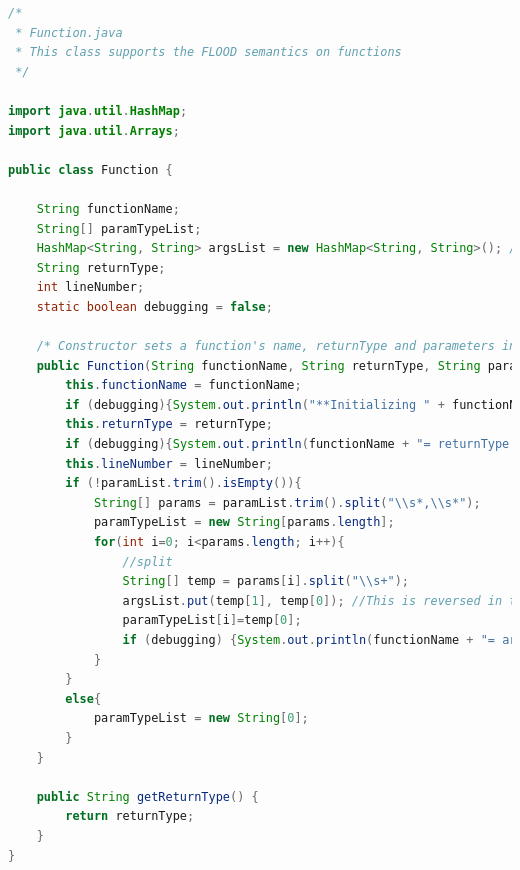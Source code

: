 \documentclass[12pt]{report}
\begin{document}
\begin{singlespace}
\begin{lstlisting}[language=Java,label=some-code,caption={Function.java}]
/*
 * Function.java
 * This class supports the FLOOD semantics on functions
 */

import java.util.HashMap;
import java.util.Arrays;

public class Function {

	String functionName;
	String[] paramTypeList;
	HashMap<String, String> argsList = new HashMap<String, String>(); //name type
	String returnType;
	int lineNumber;
	static boolean debugging = false;
	
	/* Constructor sets a function's name, returnType and parameters in the instance variables of the function */
	public Function(String functionName, String returnType, String paramList, int lineNumber){
		this.functionName = functionName;
		if (debugging){System.out.println("**Initializing " + functionName + " function**");}
		this.returnType = returnType;
		if (debugging){System.out.println(functionName + "= returnType: " + returnType);}
		this.lineNumber = lineNumber;
		if (!paramList.trim().isEmpty()){
			String[] params = paramList.trim().split("\\s*,\\s*");
			paramTypeList = new String[params.length];
			for(int i=0; i<params.length; i++){
				//split
				String[] temp = params[i].split("\\s+");
				argsList.put(temp[1], temp[0]); //This is reversed in the argument list so reversing it back here
				paramTypeList[i]=temp[0];
				if (debugging) {System.out.println(functionName + "= argName: " + temp[1] + ", type: " + temp[0]);}
			}
		}
		else{
			paramTypeList = new String[0];
		}
	}
		
	public String getReturnType() {
		return returnType;
	}
}
\end{lstlisting}
\end{singlespace}
\end{document}

